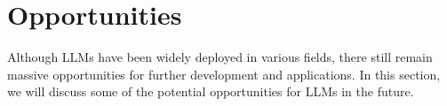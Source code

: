 \documentclass[fleqn,10pt]{SelfArx} %
\begin{document}











\section{Opportunities}

Although LLMs have been widely deployed in various fields, there still remain massive opportunities for further development and applications. In this section, we will discuss some of the potential opportunities for LLMs in the future.
\end{document}
